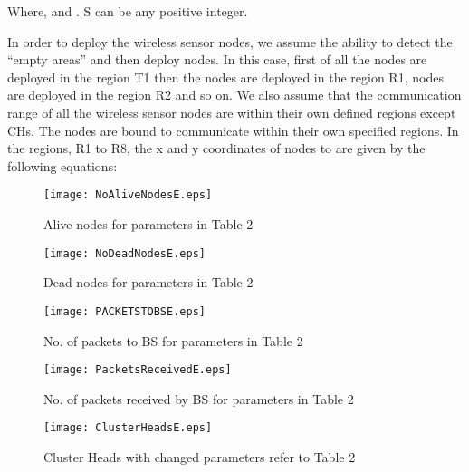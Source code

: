 \documentclass[journal]{IEEEtran}
\begin{document}
 

 
 Where,  and . S can be any positive integer.

 In order to deploy the wireless sensor nodes, we assume the ability to detect the “empty areas” and then deploy nodes. In this case, first of all the nodes  are deployed in the region T1 then the nodes  are deployed in the region R1, nodes  are deployed in the region R2 and so on. We also assume that the communication range of all the wireless sensor nodes are within their own defined regions except CHs. The nodes are bound to communicate within their own specified regions.
 In the regions, R1 to R8, the x and y coordinates of nodes  to  are given by the following equations:
 \begin{figure}[ht]
\begin{center}
\texttt{[image: NoAliveNodesE.eps]}
\vspace{-0.7cm}
\caption{Alive nodes for parameters in Table 2}
\end{center}
\end{figure}

\begin{figure}[ht]
\begin{center}
\texttt{[image: NoDeadNodesE.eps]}
\vspace{-0.7cm}
\caption{Dead nodes for parameters in Table 2}
\end{center}
\end{figure}


\begin{figure}[ht]
\begin{center}
\texttt{[image: PACKETSTOBSE.eps]}
\vspace{-0.7cm}
\caption{No. of packets to BS for parameters in Table 2}
\end{center}
\end{figure}

\begin{figure}[ht]
\begin{center}
\texttt{[image: PacketsReceivedE.eps]}
\vspace{-0.7cm}
\caption{No. of packets received by BS for parameters in Table 2}
\end{center}
\end{figure}

\begin{figure}[ht]
\begin{center}
\texttt{[image: ClusterHeadsE.eps]}
\vspace{-0.7cm}
\caption{Cluster Heads with changed parameters refer to Table 2}
\end{center}
\end{figure}
\end{document}
